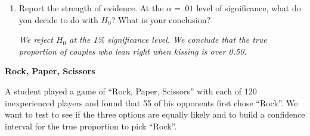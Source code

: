 \begin{enumerate}
\begin{key} 
{\it $2 \times .001 = .002$  This is  very strong evidence against the
  null. }
\end{key}


\item Report the strength of evidence.  At the $\alpha = .01$ level of
  significance, what do you decide to do with $H_0$?  What is your
  conclusion?
\begin{students}
 \vspace{3cm}
\end{students}

\begin{key} 
{\it We  reject $H_0$
  at the 1\% significance level.  We conclude that the true proportion of
  couples who lean right when kissing is over 0.50.}
\end{key}

\end{enumerate}

\begin{center}
  {\large \bf Rock, Paper, Scissors}
\end{center}

A student played a game of ``Rock, Paper, Scissors'' with each of 120
inexperienced players and found that 55 of his opponents first chose
``Rock''.  We want to test to see if the three options are equally
likely and to build a confidence interval for the true proportion to
pick ``Rock''.

